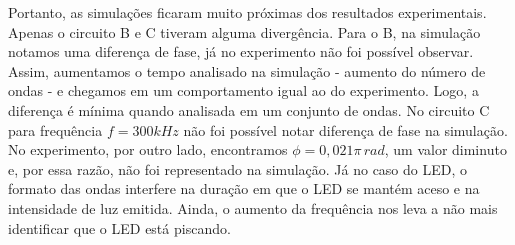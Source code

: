 \documentclass[a4paper, 11pt]{article}
\begin{document}
Portanto, as simulações ficaram muito próximas dos resultados experimentais. 
Apenas o circuito B e C tiveram alguma divergência. Para o B, na simulação notamos uma diferença de fase, já no experimento não foi possível observar. 
Assim, aumentamos o tempo analisado na simulação - aumento do número de ondas - e chegamos em um comportamento igual ao do experimento. 
Logo, a diferença é mínima quando analisada em um conjunto de ondas. 
No circuito C para frequência $f = 300kHz$ não foi possível notar diferença de fase na simulação. 
No experimento, por outro lado, encontramos  $\phi = 0,021 \pi \, rad$, um valor diminuto e, por essa razão, não foi representado na simulação. 
Já no caso do LED, o formato das ondas interfere na duração em que o LED se mantém aceso e na intensidade de luz emitida. 
Ainda, o aumento da frequência nos leva a não mais identificar que o LED está piscando.\\










\end{document}
